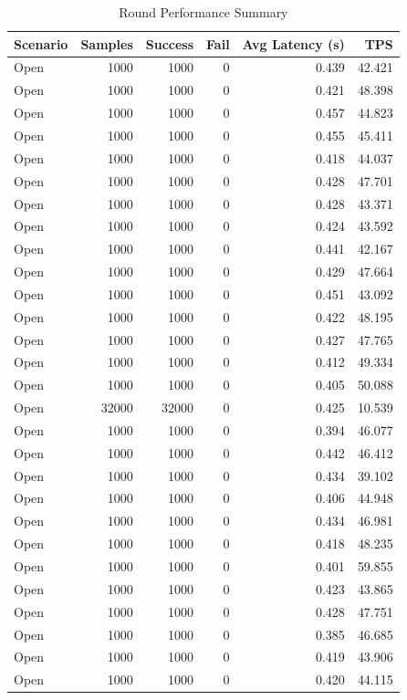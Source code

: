 \begin{table}
\caption{Round Performance Summary}
\label{tab:round_perf}
\begin{tabular}{lrrrrr}
\toprule
Scenario & Samples & Success & Fail & Avg Latency (s) & TPS \\
\midrule
Open & 1000 & 1000 & 0 & 0.439 & 42.421 \\
Open & 1000 & 1000 & 0 & 0.421 & 48.398 \\
Open & 1000 & 1000 & 0 & 0.457 & 44.823 \\
Open & 1000 & 1000 & 0 & 0.455 & 45.411 \\
Open & 1000 & 1000 & 0 & 0.418 & 44.037 \\
Open & 1000 & 1000 & 0 & 0.428 & 47.701 \\
Open & 1000 & 1000 & 0 & 0.428 & 43.371 \\
Open & 1000 & 1000 & 0 & 0.424 & 43.592 \\
Open & 1000 & 1000 & 0 & 0.441 & 42.167 \\
Open & 1000 & 1000 & 0 & 0.429 & 47.664 \\
Open & 1000 & 1000 & 0 & 0.451 & 43.092 \\
Open & 1000 & 1000 & 0 & 0.422 & 48.195 \\
Open & 1000 & 1000 & 0 & 0.427 & 47.765 \\
Open & 1000 & 1000 & 0 & 0.412 & 49.334 \\
Open & 1000 & 1000 & 0 & 0.405 & 50.088 \\
Open & 32000 & 32000 & 0 & 0.425 & 10.539 \\
Open & 1000 & 1000 & 0 & 0.394 & 46.077 \\
Open & 1000 & 1000 & 0 & 0.442 & 46.412 \\
Open & 1000 & 1000 & 0 & 0.434 & 39.102 \\
Open & 1000 & 1000 & 0 & 0.406 & 44.948 \\
Open & 1000 & 1000 & 0 & 0.434 & 46.981 \\
Open & 1000 & 1000 & 0 & 0.418 & 48.235 \\
Open & 1000 & 1000 & 0 & 0.401 & 59.855 \\
Open & 1000 & 1000 & 0 & 0.423 & 43.865 \\
Open & 1000 & 1000 & 0 & 0.428 & 47.751 \\
Open & 1000 & 1000 & 0 & 0.385 & 46.685 \\
Open & 1000 & 1000 & 0 & 0.419 & 43.906 \\
Open & 1000 & 1000 & 0 & 0.420 & 44.115 \\

\end{tabular}
\end{table}
